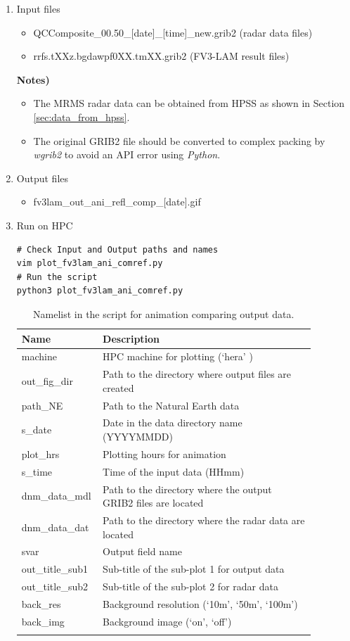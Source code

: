 \documentclass[11pt,fleqn]{report}              %
\begin{document}
\begin{enumerate}
\item Input files
\begin{itemize}
\item QCComposite\_00.50\_[date]\_[time]\_new.grib2 (radar data files)
\item rrfs.tXXz.bgdawpf0XX.tmXX.grib2 (FV3-LAM result files)
\end{itemize}

{\bf Notes)} 
\begin{itemize}
\item The MRMS radar data can be obtained from HPSS as shown in Section \ref{sec:data_from_hpss}.
\item The original GRIB2 file should be converted to complex packing by {\it wgrib2} to avoid an API error using {\it Python}.
\end{itemize}

\item Output files
\begin{itemize}
\item fv3lam\_out\_ani\_refl\_comp\_[date].gif
\end{itemize}

\item Run on HPC
\lstset{language=bash}   
\begin{lstlisting}[frame=trBL]
# Check Input and Output paths and names
vim plot_fv3lam_ani_comref.py
# Run the script
python3 plot_fv3lam_ani_comref.py
\end{lstlisting}


{
\fontsize{10}{12}\selectfont
\begin{longtable}{p{0.17\linewidth} | p{0.7\linewidth} }
\hline
\hline
Name & Description \\
\hline
 machine & HPC machine for plotting (`hera' ) \\
 out\_fig\_dir & Path to the directory where output files are created \\
 path\_NE & Path to the Natural Earth data \\
 s\_date & Date in the data directory name (YYYYMMDD) \\
 plot\_hrs & Plotting hours for animation \\
 s\_time & Time of the input data (HHmm) \\
 dnm\_data\_mdl & Path to the directory where the output GRIB2 files are located   \\
 dnm\_data\_dat & Path to the directory where the radar data are located   \\
 svar & Output field name \\
 out\_title\_sub1 & Sub-title of the sub-plot 1 for output data \\
 out\_title\_sub2 & Sub-title of the sub-plot 2 for radar data  \\
 back\_res & Background resolution (`10m', `50m', `100m') \\
 back\_img & Background image (`on', `off') \\
\hline
\caption{Namelist in the script for animation comparing output data.}
\label{table:fv3_var_ani_refl}
\end{longtable}
}


\end{enumerate}
\end{document}
